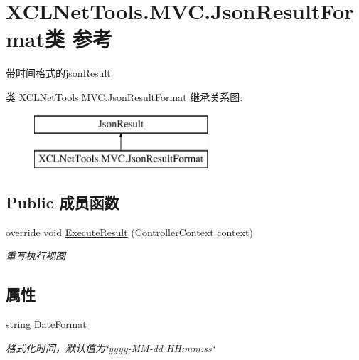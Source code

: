 \hypertarget{class_x_c_l_net_tools_1_1_m_v_c_1_1_json_result_format}{}\section{X\+C\+L\+Net\+Tools.\+M\+V\+C.\+Json\+Result\+Format类 参考}
\label{class_x_c_l_net_tools_1_1_m_v_c_1_1_json_result_format}


带时间格式的json\+Result  


类 X\+C\+L\+Net\+Tools.\+M\+V\+C.\+Json\+Result\+Format 继承关系图\+:\begin{figure}[H]
\begin{center}
\leavevmode
\includegraphics[height=2.000000cm]{class_x_c_l_net_tools_1_1_m_v_c_1_1_json_result_format}
\end{center}
\end{figure}
\subsection*{Public 成员函数}
\begin{DoxyCompactItemize}
\item 
override void \hyperlink{class_x_c_l_net_tools_1_1_m_v_c_1_1_json_result_format_aa8f3283c42c9130afd1aa8990876f413}{Execute\+Result} (Controller\+Context context)
\begin{DoxyCompactList}\small\item\em 重写执行视图 \end{DoxyCompactList}\end{DoxyCompactItemize}
\subsection*{属性}
\begin{DoxyCompactItemize}
\item 
string \hyperlink{class_x_c_l_net_tools_1_1_m_v_c_1_1_json_result_format_afc01b7cf2cd3f17c481c25ad70fcd4f6}{Date\+Format}
\begin{DoxyCompactList}\small\item\em 格式化时间，默认值为\char`\"{}yyyy-\/\+M\+M-\/dd H\+H\+:mm\+:ss\char`\"{} \end{DoxyCompactList}\end{DoxyCompactItemize}


